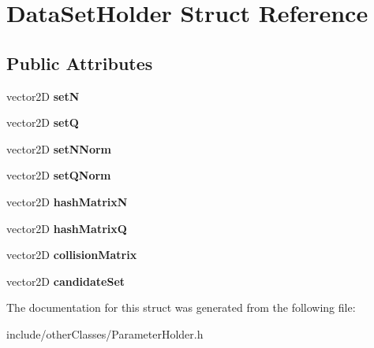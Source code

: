 \hypertarget{structDataSetHolder}{}\section{Data\+Set\+Holder Struct Reference}
\label{structDataSetHolder}
\subsection*{Public Attributes}
\begin{DoxyCompactItemize}
\item 
vector2D {\bfseries setN}\hypertarget{structDataSetHolder_aa77d352b6b726f1d07a199745e696acb}{}\label{structDataSetHolder_aa77d352b6b726f1d07a199745e696acb}

\item 
vector2D {\bfseries setQ}\hypertarget{structDataSetHolder_a9b5bc47d675255dd67cc993d6a657af2}{}\label{structDataSetHolder_a9b5bc47d675255dd67cc993d6a657af2}

\item 
vector2D {\bfseries set\+N\+Norm}\hypertarget{structDataSetHolder_a0023bd4f2c09ae26074497794dee355b}{}\label{structDataSetHolder_a0023bd4f2c09ae26074497794dee355b}

\item 
vector2D {\bfseries set\+Q\+Norm}\hypertarget{structDataSetHolder_ae0d4cbf6a18d4954295d04ea20c00088}{}\label{structDataSetHolder_ae0d4cbf6a18d4954295d04ea20c00088}

\item 
vector2D {\bfseries hash\+MatrixN}\hypertarget{structDataSetHolder_ac99468be9751b8795a79bc7a31b41008}{}\label{structDataSetHolder_ac99468be9751b8795a79bc7a31b41008}

\item 
vector2D {\bfseries hash\+MatrixQ}\hypertarget{structDataSetHolder_a2fa7a8d4d088cafc4b470569534d7356}{}\label{structDataSetHolder_a2fa7a8d4d088cafc4b470569534d7356}

\item 
vector2D {\bfseries collision\+Matrix}\hypertarget{structDataSetHolder_af0cc62b3f69abff7e205dd07f1d54aa6}{}\label{structDataSetHolder_af0cc62b3f69abff7e205dd07f1d54aa6}

\item 
vector2D {\bfseries candidate\+Set}\hypertarget{structDataSetHolder_aab313db309e852fde47f2438ed979cd9}{}\label{structDataSetHolder_aab313db309e852fde47f2438ed979cd9}

\end{DoxyCompactItemize}


The documentation for this struct was generated from the following file\+:\begin{DoxyCompactItemize}
\item 
include/other\+Classes/Parameter\+Holder.\+h\end{DoxyCompactItemize}
